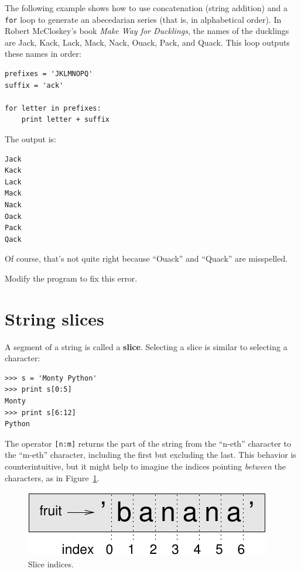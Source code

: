 \documentclass[10pt]{book}
\begin{document}
\begin{CJK}{UTF8}{gbsn}
The following example shows how to use concatenation (string addition)
and a {\tt for} loop to generate an abecedarian series (that is, in
alphabetical order).  In Robert McCloskey's book {\em Make
Way for Ducklings}, the names of the ducklings are Jack, Kack, Lack,
Mack, Nack, Ouack, Pack, and Quack.  This loop outputs these names in
order:

\begin{verbatim}
prefixes = 'JKLMNOPQ'
suffix = 'ack'

for letter in prefixes:
    print letter + suffix
\end{verbatim}
%
The output is:

\begin{verbatim}
Jack
Kack
Lack
Mack
Nack
Oack
Pack
Qack
\end{verbatim}
%
Of course, that's not quite right because ``Ouack'' and
``Quack'' are misspelled.

\begin{exercise}

Modify the program to fix this error.

\end{exercise}



\section{String slices}
\label{slice}

A segment of a string is called a {\bf slice}.  Selecting a slice is
similar to selecting a character:

\begin{verbatim}
>>> s = 'Monty Python'
>>> print s[0:5]
Monty
>>> print s[6:12]
Python
\end{verbatim}
%
The operator {\tt [n:m]} returns the part of the string from the 
``n-eth'' character to the ``m-eth'' character, including the first but
excluding the last.  This behavior is counterintuitive, but it might
help to imagine the indices pointing {\em between} the
characters, as in Figure~\ref{fig.banana}.

\begin{figure}
\centerline
{\includegraphics[scale=0.8]{figs/banana.pdf}}
\caption{Slice indices.}
\label{fig.banana}
\end{figure}



\end{CJK}
\end{document}
